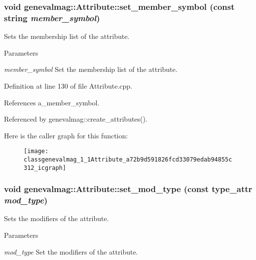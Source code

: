 \hypertarget{classgenevalmag_1_1Attribute_a72b9d591826fcd33079edab94855c312}{
\subsubsection[{set\_\-member\_\-symbol}]{\setlength{\rightskip}{0pt plus 5cm}void genevalmag::Attribute::set\_\-member\_\-symbol (const string {\em member\_\-symbol})}}
\label{classgenevalmag_1_1Attribute_a72b9d591826fcd33079edab94855c312}
Sets the membership list of the attribute. 
\begin{DoxyParams}{Parameters}
\item[{\em member\_\-symbol}]Set the membership list of the attribute. \end{DoxyParams}


Definition at line 130 of file Attribute.cpp.



References a\_\-member\_\-symbol.



Referenced by genevalmag::create\_\-attributes().



Here is the caller graph for this function:\nopagebreak
\begin{figure}[H]
\begin{center}
\leavevmode
\texttt{[image: classgenevalmag\_1\_1Attribute\_a72b9d591826fcd33079edab94855c312\_icgraph]}
\end{center}
\end{figure}


\hypertarget{classgenevalmag_1_1Attribute_a5145c88f9e2e6e797996e6a31a2492fb}{
\subsubsection[{set\_\-mod\_\-type}]{\setlength{\rightskip}{0pt plus 5cm}void genevalmag::Attribute::set\_\-mod\_\-type (const {\bf type\_\-attr} {\em mod\_\-type})}}
\label{classgenevalmag_1_1Attribute_a5145c88f9e2e6e797996e6a31a2492fb}
Sets the modifiers of the attribute. 
\begin{DoxyParams}{Parameters}
\item[{\em mod\_\-type}]Set the modifiers of the attribute. \end{DoxyParams}



